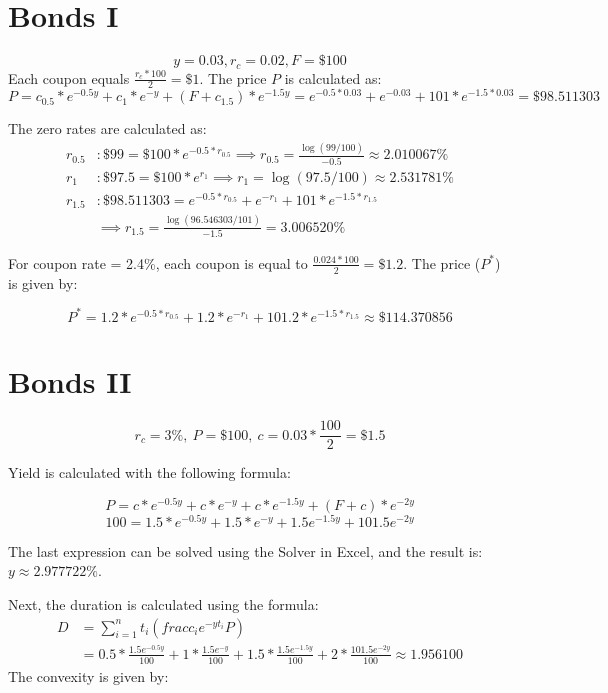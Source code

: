 \documentclass{article}
\begin{document}
\section*{Bonds I}

$$ y=0.03, r_c = 0.02, F=\$100$$
Each coupon equals $\frac{r_c * 100}{2} = \$1$. The price $P$ is calculated as:
$$P = c_{0.5} * e^{-0.5y} + c_{1} * e^{-y} + (F+c_{1.5}) * e^{-1.5y} = e^{-0.5*0.03} + e^{-0.03} + 101 * e^{-1.5*0.03} = \$98.511303$$

The zero rates are calculated as:
\begin{align*}
	r_{0.5} &: \$99 = \$100*e^{-0.5*r_{0.5}} \implies r_{0.5} = \frac{\log\left(99/100\right)}{-0.5} \approx 2.010067\%\\
	r_{1} &: \$97.5 = \$100*e^{r_{1}} \implies r_{1} = \log\left(97.5/100\right) \approx 2.531781 \% \\
	r_{1.5} &: \$98.511303 = e^{-0.5 * r_{0.5}} + e^{-r_1} + 101*e^{-1.5*r_{1.5}} \\
	& \implies r_{1.5} = \frac{ \log\left( 96.546303 / 101 \right)}{-1.5} = 3.006520 \%
\end{align*}

For coupon rate = 2.4\%, each coupon is equal to $\frac{0.024 * 100}{2} = \$1.2$. The price ($P^*$) is given by:

$$P^* = 1.2 * e^{-0.5*r_{0.5}} + 1.2 * e^{-r_1} + 101.2 * e^{-1.5*r_{1.5}} \approx \$114.370856 $$


\section*{Bonds II}

$$r_c = 3\%, \ P = \$100, \ c = 0.03 * \frac{100}{2} = \$1.5$$

Yield is calculated with the following formula:

$$P = c * e^{-0.5y} + c*e^{-y} + c*e^{-1.5y} + (F+c)*e^{-2y}$$
$$100 = 1.5 * e^{-0.5y} + 1.5*e^{-y} + 1.5e^{-1.5y} + 101.5e^{-2y}$$

The last expression can be solved using the Solver in Excel, and the result is: $y \approx 2.977722 \%$.

Next, the duration is calculated using the formula:
\begin{align*}
	D &= \sum_{i=1}^n t_i \left(frac{c_ie^{-yt_i}}{P}\right) \\
	&= 0.5 * \frac{1.5e^{-0.5y}}{100} + 1*\frac{1.5e^{-y}}{100} + 1.5 * \frac{1.5e^{-1.5y}}{100} + 2 * \frac{101.5e^{-2y}}{100} \approx 1.956100
\end{align*}
The convexity is given by:
\end{document}
